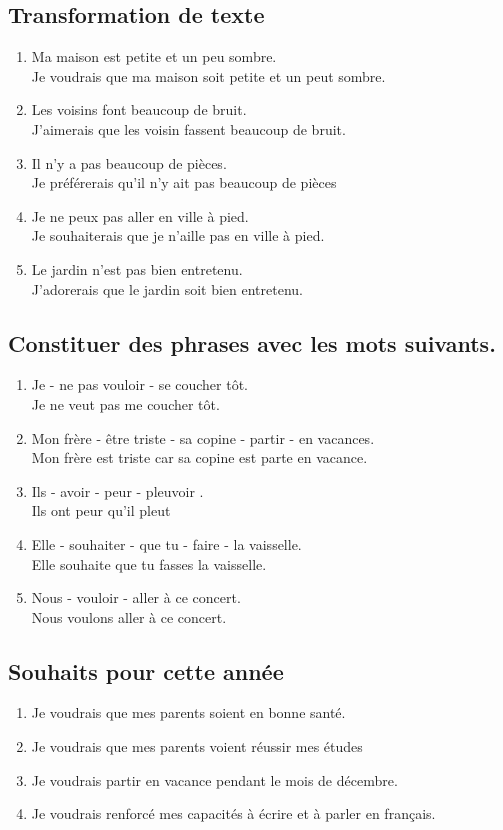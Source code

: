 \documentclass[12pt]{article}
\begin{document}
\subsection{Transformation de texte}
\begin{enumerate}
	\item Ma maison est petite et un peu sombre.\\
	       Je voudrais que ma maison soit petite et un peut sombre.
	\item Les voisins font beaucoup de bruit.\\
	       J’aimerais que les voisin fassent beaucoup de bruit.
	\item Il n’y a pas beaucoup de pièces.\\
	        Je préférerais qu'il n'y ait pas beaucoup de pièces
	\item Je ne peux pas aller en ville à pied.\\
	        Je souhaiterais que je n'aille pas en ville à pied.
	\item Le jardin n’est pas bien entretenu.\\
	        J’adorerais que le jardin soit bien entretenu.
\end{enumerate}
\subsection{Constituer des phrases avec les mots suivants.}
\begin{enumerate}
	\item Je - ne pas vouloir - se coucher tôt.\\
	       Je ne veut pas me coucher tôt.
	\item Mon frère - être triste - sa copine - partir - en vacances.\\
	       Mon frère est triste car sa copine est parte en vacance.
	\item Ils - avoir - peur - pleuvoir .\\
	       Ils ont peur qu'il pleut
	\item Elle - souhaiter - que tu - faire - la vaisselle.\\
	       Elle souhaite que tu fasses la vaisselle.
	\item Nous - vouloir - aller à ce concert.\\
	       Nous voulons aller à ce concert.
\end{enumerate}
\subsection{Souhaits pour cette année}
\begin{enumerate}
	\item Je voudrais que mes parents soient en bonne santé.
	\item Je voudrais que mes parents voient réussir mes études
	\item Je voudrais partir en vacance pendant le mois de décembre.
	\item Je voudrais renforcé mes capacités à écrire et à parler en français.
\end{enumerate}
\end{document}
